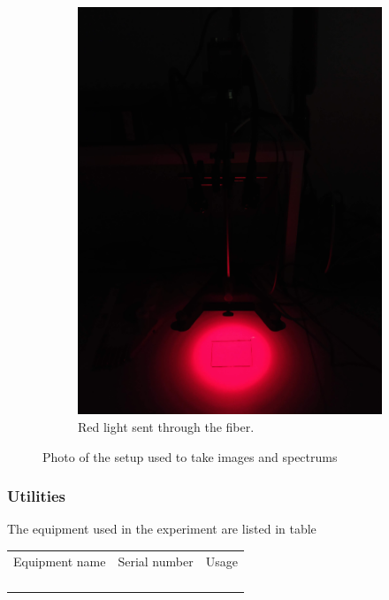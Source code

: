 \begin{figure}[h]
\begin{subfigure}{0.3333\textwidth}
        \includegraphics[width=0.95\linewidth]{figures/project_setup_red.png}
        \caption{Red light sent through the fiber.}
        \label{fig:picture_of_setup_red}
    \end{subfigure}
    \caption{Photo of the setup used to take images and spectrums}
    \label{fig:photo_of_setup}
\end{figure}

\subsubsection{Utilities}
The equipment used in the experiment are listed in table 

\begin{table}[]
    \begin{tabular}{lll}
    Equipment name & Serial number & Usage \\
                   &               &       \\
                   &               &       \\
                   &               &       \\
                   &               &      
    \end{tabular}
\end{table}

